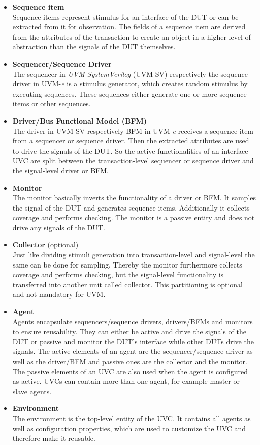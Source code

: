 \begin{itemize}
  \item \textbf{Sequence item}\\
  Sequence items represent stimulus for an interface of the
  DUT or can be extracted from it for observation.
  The fields of a sequence item are derived from the attributes of the transaction
  to create an object in a higher level of abstraction than the signals of the
  DUT themselves.
  \item \textbf{Sequencer/Sequence Driver}\\
  The sequencer in \emph{UVM-SystemVerilog} (UVM-SV) respectively the sequence
  driver in UVM-\textit{e} is a stimulus generator, which creates random
  stimulus by executing sequences. These sequences either generate one or more
  sequence items or other sequences.
  \item \textbf{Driver/Bus Functional Model (BFM)}\\
  The driver in UVM-SV respectively BFM in UVM-\textit{e} receives a sequence
  item from a sequencer or sequence driver. Then the extracted attributes are
  used to drive the signals of the DUT. So the active functionalities of an
  interface UVC are split between the transaction-level sequencer or sequence
  driver and the signal-level driver or BFM.
  \item \textbf{Monitor}\\
  The monitor basically inverts the functionality of a driver or BFM. It samples
  the signal of the DUT and generates sequence items. Additionally it collects coverage
  and performs checking. The monitor is a passive entity and does not drive any
  signals of the DUT.
  \item \textbf{Collector} (optional)\\
  Just like dividing stimuli generation into transaction-level and signal-level
  the same can be done for sampling. Thereby the monitor furthermore collects
  coverage and performs checking, but the signal-level functionality is
  transferred into another unit called collector. This partitioning is optional
  and not mandatory for UVM.
  \item \textbf{Agent}\\
  Agents encapsulate sequencers/sequence drivers, drivers/BFMs and monitors to
  ensure reusability. They can either be active and drive the signals of the DUT
  or passive and monitor the DUT's interface while other DUTs drive the
  signals. The active elements of an agent are the sequencer/sequence driver as
  well as the driver/BFM and passive ones are the collector and the monitor. The
  passive elements of an UVC are also used when the agent is configured as
  active. UVCs can contain more than one agent, for example master or slave
  agents.
  \item \textbf{Environment}\\
  The environment is the top-level entity of the UVC. It contains all agents as
  well as configuration properties, which are used to customize the UVC and
  therefore make it reusable.
\end{itemize}

